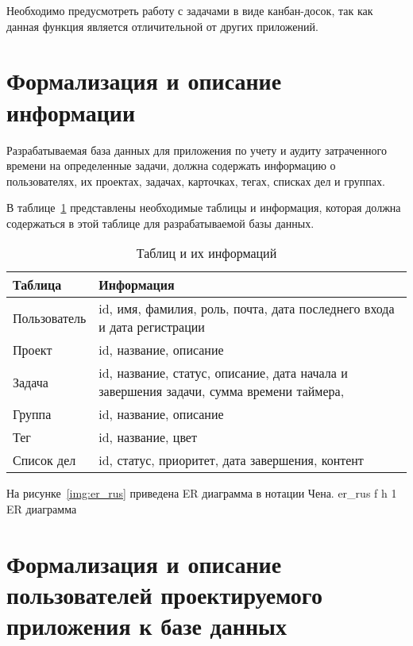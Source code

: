 Необходимо предусмотреть работу с задачами в виде канбан-досок, так как данная функция является отличительной от других приложений.

\section{Формализация и описание информации}
 
Разрабатываемая база данных для приложения по учету и аудиту затраченного времени на определенные задачи, должна содержать информацию о пользователях, их проектах, задачах, карточках, тегах, списках дел и группах. 

В таблице~\ref{tab:er} представлены необходимые таблицы и информация, которая должна содержаться в этой таблице для разрабатываемой базы данных.
\begin{table}[H]
	\centering
	\caption{Таблиц и их информаций}
	\label{tab:er}
	\begin{tabularx}{\textwidth}{|l|X|}
		\hline
		\textbf{Таблица} & \textbf{Информация} \\ \hline
		Пользователь      & id, имя, фамилия, роль, почта, дата последнего входа и дата регистрации    \\ \hline
		Проект            & id, название, описание  \\ \hline
		Задача            & id, название, статус, описание, дата начала и завершения задачи, сумма времени таймера, \\ \hline
		Группа            & id, название, описание  \\ \hline
		Тег               & id, название, цвет  \\ \hline
		Список дел        & id, статус, приоритет, дата завершения, контент \\ \hline
	\end{tabularx}
\end{table}
\clearpage

На рисунке~\ref{img:er_rus} приведена ER диаграмма в нотации Чена.
{er_rus} %
{f} %
{h} %
{1\textwidth} %
{ER диаграмма} %

\clearpage 
\section{Формализация и описание пользователей проектируемого приложения к базе данных}

